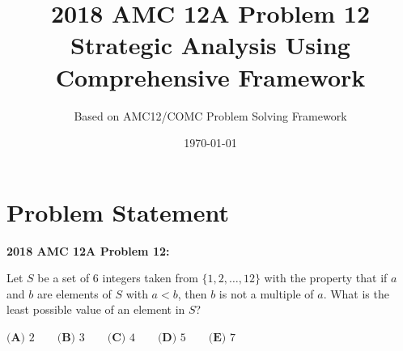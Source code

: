 \documentclass[12pt]{article}
\title{\textbf{2018 AMC 12A Problem 12\\Strategic Analysis Using Comprehensive Framework}}
\author{Based on AMC12/COMC Problem Solving Framework}
\date{\today}
\begin{document}
\maketitle

\section*{Problem Statement}

\textbf{2018 AMC 12A Problem 12:}

Let $S$ be a set of 6 integers taken from $\{1,2,\ldots,12\}$ with the property that if $a$ and $b$ are elements of $S$ with $a<b$, then $b$ is not a multiple of $a$. What is the least possible value of an element in $S$?

$\textbf{(A) } 2 \qquad \textbf{(B) } 3 \qquad \textbf{(C) } 4 \qquad \textbf{(D) } 5 \qquad \textbf{(E) } 7$

\newpage
\end{document}
